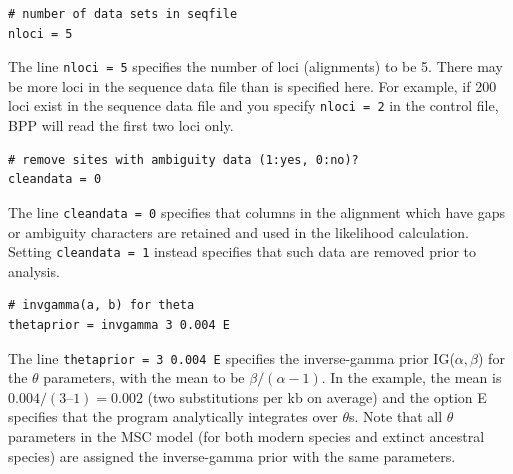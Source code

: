 \documentclass[a4paper]{book}
\numberwithin{equation}{section} \renewcommand{\baselinestretch}{0.55}
\begin{document}
\begin{verbatim}
# number of data sets in seqfile
nloci = 5  
\end{verbatim}
The line \texttt{nloci = 5} specifies the number of loci (alignments)
to be 5.  There may be more loci in the sequence data file than is
specified here. For example, if 200 loci exist in the sequence data
file and you specify \texttt{nloci = 2} in the control file,
\textsc{BPP} will read the first two loci only.

\begin{verbatim}
# remove sites with ambiguity data (1:yes, 0:no)?
cleandata = 0    
\end{verbatim}
The line \texttt{cleandata = 0} specifies that columns in the
alignment which have gaps or ambiguity characters are retained and
used in the likelihood calculation. Setting \texttt{cleandata = 1}
instead specifies that such data are removed prior to analysis.
\begin{verbatim}
# invgamma(a, b) for theta
thetaprior = invgamma 3 0.004 E  
\end{verbatim}
The line \texttt{thetaprior = 3 0.004 E} specifies the inverse-gamma
prior IG($\alpha, \beta$) for the $\theta$ parameters, with the mean
to be $\beta/(\alpha-1)$.  In the example, the mean is
$0.004/(3 – 1) = 0.002$ (two substitutions per kb on average) and the
option E specifies that the program analytically integrates over
$\theta$s.  Note that all $\theta$ parameters in the MSC model (for
both modern species and extinct ancestral species) are assigned the
inverse-gamma prior with the same parameters.
\end{document}
